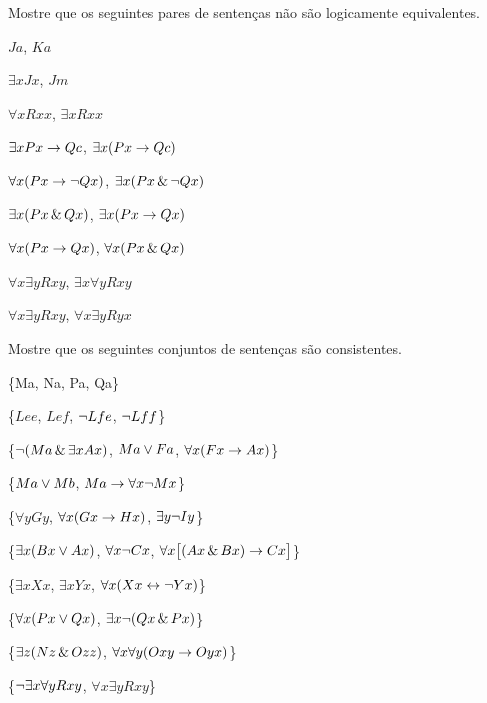 \solutions
\problempart
\label{pr.NotEquiv}
Mostre que os seguintes pares de sentenças não são logicamente equivalentes.
\begin{earg}
\item $Ja$, $Ka$
\item $\exists x Jx$, $Jm$
\item $\forall x Rxx$, $\exists x Rxx$
\item $\exists x Px \rightarrow Qc$, $\exists x (Px \rightarrow Qc)$
\item $\forall x(Px \rightarrow \neg Qx)$, $\exists x(Px \,\&\, \neg Qx)$
\item $\exists x(Px \,\&\, Qx)$, $\exists x(Px \rightarrow Qx)$
\item $\forall x(Px\rightarrow Qx)$, $\forall x(Px \,\&\, Qx)$
\item $\forall x\exists y Rxy$, $\exists x\forall y Rxy$
\item $\forall x\exists y Rxy$, $\forall x\exists y Ryx$
\end{earg}

\problempart
Mostre que os seguintes conjuntos de sentenças são consistentes.
\begin{earg}
\item \{Ma, \enot Na, Pa, \enot Qa\}
\item \{$Lee$, $Lef$, $\neg Lfe$, $\neg Lff$\}
\item \{$\neg (Ma \,\&\, \exists x Ax)$, $Ma \vee Fa$, $\forall x(Fx \rightarrow Ax)$\}
\item \{$Ma \vee Mb$, $Ma \rightarrow \forall x \neg Mx$\}
\item \{$\forall y Gy$, $\forall x (Gx \rightarrow Hx)$, $\exists y \neg Iy$\}
\item \{$\exists x(Bx \vee Ax)$, $\forall x \neg Cx$, $\forall x\bigl[(Ax \,\&\, Bx) \rightarrow Cx\bigr]$\}
\item \{$\exists x Xx$, $\exists x Yx$, $\forall x(Xx \leftrightarrow \neg Yx)$\}
\item \{$\forall x(Px \vee Qx)$, $\exists x\neg(Qx \,\&\, Px)$\}
\item \{$\exists z(Nz \,\&\, Ozz)$, $\forall x\forall y(Oxy \rightarrow Oyx)$\}
\item \{$\neg \exists x \forall y Rxy$, $\forall x \exists y Rxy$\}
\end{earg}

